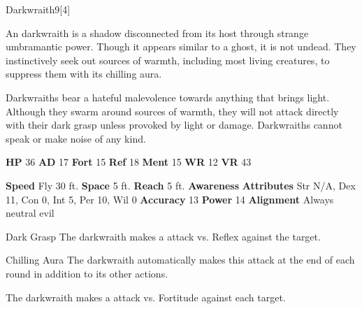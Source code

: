   \begin{monsection}{Darkwraith}{9}[4]
    \vspace{-1em}\vspace{-1em}
    \vspace{0em}

    
        An darkwraith is a shadow disconnected from its host through strange umbramantic power.
        Though it appears similar to a ghost, it is not undead.
        They instinctively seek out sources of warmth, including most living creatures, to suppress them with its chilling aura.
      
        Darkwraiths bear a hateful malevolence towards anything that brings light.
        Although they swarm around sources of warmth, they will not attack directly with their dark grasp unless provoked by light or damage.
        Darkwraiths cannot speak or make noise of any kind.
      

    \begin{spellcontent}
      \begin{spelltargetinginfo}
        \pari \textbf{HP} 36 \monsep
          \textbf{AD} 17 \monsep
          \textbf{Fort} 15 \monsep
          \textbf{Ref} 18 \monsep
          \textbf{Ment} 15
        \pari \textbf{WR} 12 \monsep
        \textbf{VR} 43
        
      \end{spelltargetinginfo}
    \end{spellcontent}
    \begin{monsterfooter}
      \pari \textbf{Speed} Fly 30 ft. \monsep
        \textbf{Space} 5 ft. \monsep
        \textbf{Reach} 5 ft.
      \pari \textbf{Awareness} 
      \pari \textbf{Attributes}
        Str N/A, Dex 11,
        Con 0, Int 5,
        Per 10, Wil 0
      \pari \textbf{Accuracy} 13 \monsep
        \textbf{Power} 14
      \pari \textbf{Alignment} Always neutral evil
    \end{monsterfooter}
  \end{monsection}
  \begin{freeability}{Dark Grasp}
       The darkwraith makes a  attack
        vs. Reflex against the target.
    \end{freeability}
  

    \begin{freeability}{Chilling Aura}
      The darkwraith automatically makes this attack at the end of each round in addition to its other actions.
          \par The darkwraith makes a  attack
        vs. Fortitude against each target.
    \end{freeability}
  
